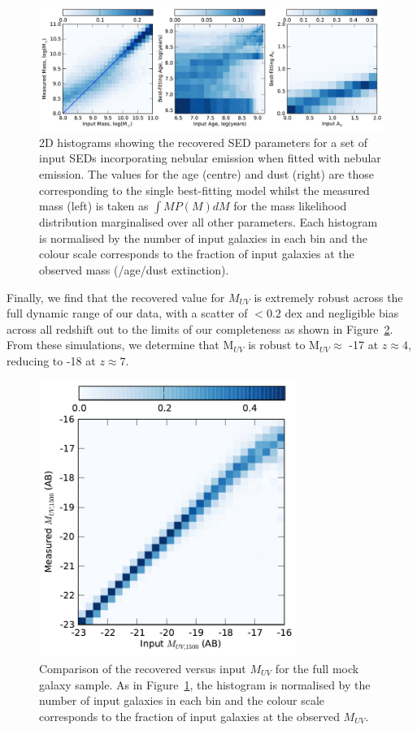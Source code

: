 \begin{figure}
\includegraphics[width=\textwidth]{plots/fig5.pdf}
\caption[Short caption]{2D histograms showing the recovered SED parameters for a set of input SEDs incorporating nebular emission when fitted with nebular emission. The values for the age (centre) and dust (right) are those corresponding to the single best-fitting model whilst the measured mass (left) is taken as $\int M P(M)dM$ for the mass likelihood distribution  marginalised over all other parameters. Each histogram is normalised by the number of input galaxies in each bin and the colour scale corresponds to the fraction of input galaxies at the observed mass (/age/dust extinction).}
\label{fig:masscomparison}
\end{figure}

Finally, we find that the recovered value for $M_{UV}$ is extremely robust across the full dynamic range of our data, with a scatter of $< 0.2$ dex and negligible bias across all redshift out to the limits of our completeness as shown in Figure~\ref{fig:muvcomparison}. From these simulations, we determine that M$_{UV}$ is robust to M$_{UV} \approx$ -17 at $z \approx 4$, reducing to -18 at $z \approx 7$.

\begin{figure}
\centering
\includegraphics[width=84mm]{plots/fig6.pdf}
\caption[Short caption]{Comparison of the recovered versus input $M_{UV}$ for the full mock galaxy sample. As in Figure~\ref{fig:masscomparison}, the histogram is normalised by the number of input galaxies in each bin and the colour scale corresponds to the fraction of input galaxies at the observed $M_{UV}$.}
\label{fig:muvcomparison}
\end{figure}

